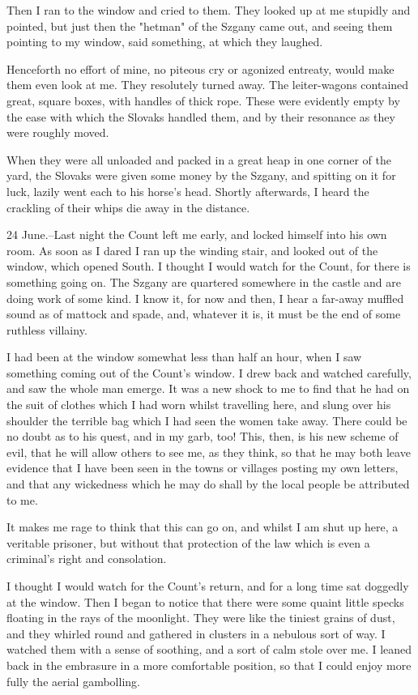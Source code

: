 Then I ran to the window and cried to them. They looked up at me stupidly and pointed, but just then the "hetman" of the Szgany came out, and seeing them pointing to my window, said something, at which they laughed. 

Henceforth no effort of mine, no piteous cry or agonized entreaty, would make them even look at me. They resolutely turned away. The leiter-wagons contained great, square boxes, with handles of thick rope. These were evidently empty by the ease with which the Slovaks handled them, and by their resonance as they were roughly moved. 

When they were all unloaded and packed in a great heap in one corner of the yard, the Slovaks were given some money by the Szgany, and spitting on it for luck, lazily went each to his horse's head. Shortly afterwards, I heard the crackling of their whips die away in the distance. 

24 June.--Last night the Count left me early, and locked himself into his own room. As soon as I dared I ran up the winding stair, and looked out of the window, which opened South. I thought I would watch for the Count, for there is something going on. The Szgany are quartered somewhere in the castle and are doing work of some kind. I know it, for now and then, I hear a far-away muffled sound as of mattock and spade, and, whatever it is, it must be the end of some ruthless villainy. 

I had been at the window somewhat less than half an hour, when I saw something coming out of the Count's window. I drew back and watched carefully, and saw the whole man emerge. It was a new shock to me to find that he had on the suit of clothes which I had worn whilst travelling here, and slung over his shoulder the terrible bag which I had seen the women take away. There could be no doubt as to his quest, and in my garb, too! This, then, is his new scheme of evil, that he will allow others to see me, as they think, so that he may both leave evidence that I have been seen in the towns or villages posting my own letters, and that any wickedness which he may do shall by the local people be attributed to me. 

It makes me rage to think that this can go on, and whilst I am shut up here, a veritable prisoner, but without that protection of the law which is even a criminal's right and consolation. 

I thought I would watch for the Count's return, and for a long time sat doggedly at the window. Then I began to notice that there were some quaint little specks floating in the rays of the moonlight. They were like the tiniest grains of dust, and they whirled round and gathered in clusters in a nebulous sort of way. I watched them with a sense of soothing, and a sort of calm stole over me. I leaned back in the embrasure in a more comfortable position, so that I could enjoy more fully the aerial gambolling. 

